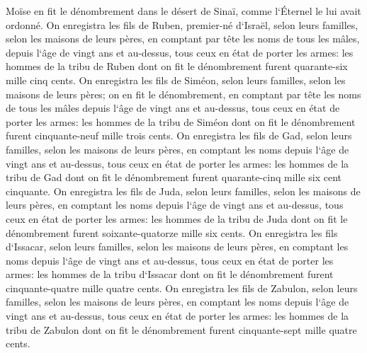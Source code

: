 \verse Moïse en fit le dénombrement dans le désert de Sinaï, comme l`Éternel le lui avait ordonné. 
\verse On enregistra les fils de Ruben, premier-né d`Israël, selon leurs familles, selon les maisons de leurs pères, en comptant par tête les noms de tous les mâles, depuis l`âge de vingt ans et au-dessus, tous ceux en état de porter les armes: 
\verse les hommes de la tribu de Ruben dont on fit le dénombrement furent quarante-six mille cinq cents. 
\verse On enregistra les fils de Siméon, selon leurs familles, selon les maisons de leurs pères; on en fit le dénombrement, en comptant par tête les noms de tous les mâles depuis l`âge de vingt ans et au-dessus, tous ceux en état de porter les armes: 
\verse les hommes de la tribu de Siméon dont on fit le dénombrement furent cinquante-neuf mille trois cents. 
\verse On enregistra les fils de Gad, selon leurs familles, selon les maisons de leurs pères, en comptant les noms depuis l`âge de vingt ans et au-dessus, tous ceux en état de porter les armes: 
\verse les hommes de la tribu de Gad dont on fit le dénombrement furent quarante-cinq mille six cent cinquante. 
\verse On enregistra les fils de Juda, selon leurs familles, selon les maisons de leurs pères, en comptant les noms depuis l`âge de vingt ans et au-dessus, tous ceux en état de porter les armes: 
\verse les hommes de la tribu de Juda dont on fit le dénombrement furent soixante-quatorze mille six cents. 
\verse On enregistra les fils d`Issacar, selon leurs familles, selon les maisons de leurs pères, en comptant les noms depuis l`âge de vingt ans et au-dessus, tous ceux en état de porter les armes: 
\verse les hommes de la tribu d`Issacar dont on fit le dénombrement furent cinquante-quatre mille quatre cents. 
\verse On enregistra les fils de Zabulon, selon leurs familles, selon les maisons de leurs pères, en comptant les noms depuis l`âge de vingt ans et au-dessus, tous ceux en état de porter les armes: 
\verse les hommes de la tribu de Zabulon dont on fit le dénombrement furent cinquante-sept mille quatre cents. 
